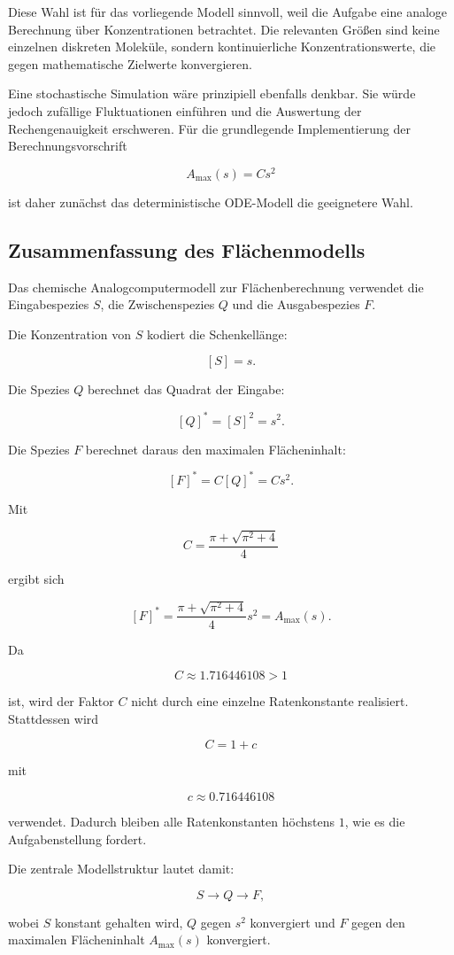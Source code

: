 Diese Wahl ist für das vorliegende Modell sinnvoll, weil die Aufgabe eine
analoge Berechnung über Konzentrationen betrachtet. Die relevanten Größen
sind keine einzelnen diskreten Moleküle, sondern kontinuierliche
Konzentrationswerte, die gegen mathematische Zielwerte konvergieren.

Eine stochastische Simulation wäre prinzipiell ebenfalls denkbar. Sie
würde jedoch zufällige Fluktuationen einführen und die Auswertung der
Rechengenauigkeit erschweren. Für die grundlegende Implementierung der
Berechnungsvorschrift

\[
A_{\max}(s)=Cs^2
\]

ist daher zunächst das deterministische ODE-Modell die geeignetere Wahl.

\subsection{Zusammenfassung des Flächenmodells}

Das chemische Analogcomputermodell zur Flächenberechnung verwendet die
Eingabespezies \(S\), die Zwischenspezies \(Q\) und die Ausgabespezies
\(F\).

Die Konzentration von \(S\) kodiert die Schenkellänge:

\[
[S]=s.
\]

Die Spezies \(Q\) berechnet das Quadrat der Eingabe:

\[
[Q]^*=[S]^2=s^2.
\]

Die Spezies \(F\) berechnet daraus den maximalen Flächeninhalt:

\[
[F]^*
=
C[Q]^*
=
Cs^2.
\]

Mit

\[
C=
\frac{\pi+\sqrt{\pi^2+4}}{4}
\]

ergibt sich

\[
[F]^*
=
\frac{\pi+\sqrt{\pi^2+4}}{4}s^2
=
A_{\max}(s).
\]

Da

\[
C\approx1.716446108>1
\]

ist, wird der Faktor \(C\) nicht durch eine einzelne Ratenkonstante
realisiert. Stattdessen wird

\[
C=1+c
\]

mit

\[
c\approx0.716446108
\]

verwendet. Dadurch bleiben alle Ratenkonstanten höchstens \(1\), wie es
die Aufgabenstellung fordert.

Die zentrale Modellstruktur lautet damit:

\[
S
\longrightarrow
Q
\longrightarrow
F,
\]

wobei \(S\) konstant gehalten wird, \(Q\) gegen \(s^2\) konvergiert und
\(F\) gegen den maximalen Flächeninhalt \(A_{\max}(s)\) konvergiert.
